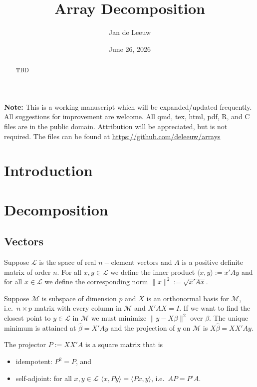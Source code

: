 \documentclass[
  12pt,
  letterpaper,
  DIV=11,
  numbers=noendperiod]{scrartcl}
\title{Array Decomposition}
\author{Jan de Leeuw}
\date{June 26, 2026}
\providecommand{\tightlist}{%
  \setlength{\itemsep}{0pt}\setlength{\parskip}{0pt}}
\newcommand{\sectionbreak}{\clearpage}
\renewcommand*\contentsname{Table of contents}
\newcommand\contentsname{Table of contents}
\begin{document}
\maketitle
\begin{abstract}
TBD
\end{abstract}

\renewcommand*\contentsname{Table of contents}
{
\setcounter{tocdepth}{3}
\tableofcontents
}

\sectionbreak

\textbf{Note:} This is a working manuscript which will be
expanded/updated frequently. All suggestions for improvement are
welcome. All qmd, tex, html, pdf, R, and C files are in the public
domain. Attribution will be appreciated, but is not required. The files
can be found at \url{https://github.com/deleeuw/arrays}

\sectionbreak

\section{Introduction}\label{introduction}

\section{Decomposition}\label{decomposition}

\subsection{Vectors}\label{vectors}

Suppose \(\mathcal{L}\) is the space of real \(n-\)element vectors and
\(A\) is a positive definite matrix of order \(n\). For all
\(x,y\in\mathcal{L}\) we define the inner product
\(\langle x, y\rangle:=x'Ay\) and for all \(x\in\mathcal{L}\) we define
the corresponding norm \(\|x\|^2:=\sqrt{x'Ax}\).

Suppose \(\mathcal{M}\) is subspace of dimension \(p\) and \(X\) is an
orthonormal basis for \(\mathcal{M}\), i.e.~\(n\times p\) matrix with
every column in \(\mathcal{M}\) and \(X'AX=I\). If we want to find the
closest point to \(y\in\mathcal{L}\) in \(\mathcal{M}\) we must minimize
\(\|y-X\beta\|^2\) over \(\beta\). The unique minimum is attained at
\(\hat\beta=X'Ay\) and the projection of \(y\) on \(\mathcal{M}\) is
\(X\hat\beta=XX'Ay\).

The projector \(P:=XX'A\) is a square matrix that is

\begin{itemize}
\tightlist
\item
  idempotent: \(P^2=P\), and
\item
  self-adjoint: for all \(x,y\in\mathcal{L}\)
  \(\langle x,Py\rangle=\langle Px, y\rangle\), i.e.~\(AP=P'A\).
\end{itemize}
\end{document}
